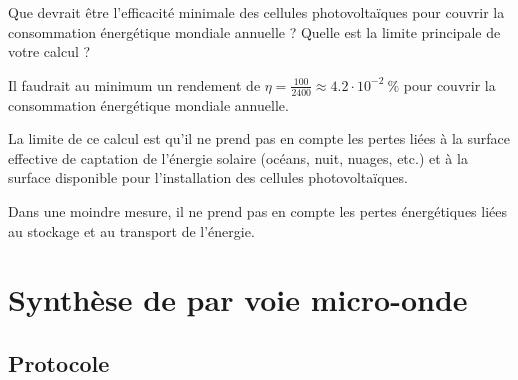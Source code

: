 \documentclass[twoside,a4paper,11pt,addpoints]{exam}%
\newcounter{foo} %
\begin{document}
\begin{questions}
\begin{mybox}
\begin{solution}[10cm]
   \end{solution}
\end{mybox}

   \question[1] Que devrait être l'efficacité minimale des cellules photovoltaïques pour couvrir la consommation énergétique mondiale annuelle ? Quelle est la limite principale de votre calcul ?

   \begin{mybox}
      \begin{solution}[5cm]
         Il faudrait au minimum un rendement de $ \eta = \frac{100}{2400} \approx 4.2 \cdot 10^{-2} ~ \si{\percent} $ pour couvrir la consommation énergétique mondiale annuelle.
         
         La limite de ce calcul est qu'il ne prend pas en compte les pertes liées à la surface effective de captation de l'énergie solaire (océans, nuit, nuages, etc.) et à la surface disponible pour l'installation des cellules photovoltaïques.

         Dans une moindre mesure, il ne prend pas en compte les pertes énergétiques liées au stockage et au transport de l'énergie.
      \end{solution}
   \end{mybox}

\setcounter{foo}{\value{question}}

\end{questions}


\section{Synthèse de  par voie micro-onde}

\subsection{Protocole}

\end{document}
